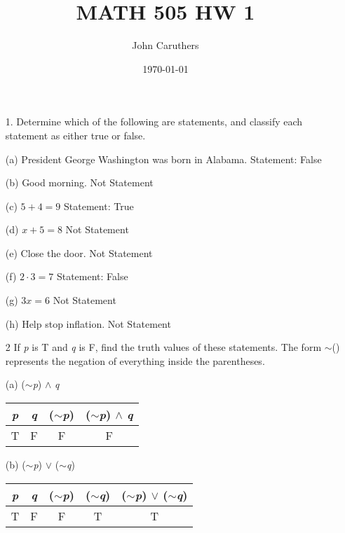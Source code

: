 \documentclass{article}
\title{MATH 505 HW 1}
\author{John Caruthers}
\date\today
\begin{document}
\maketitle

\begin{itemize}
    \item [1.] Determine which of the following are statements, and classify each statement as either true or false.
    
    (a) President George Washington was born in Alabama. {\color{blue} Statement: False}
    
    (b) Good morning. {\color{red} Not Statement}
    
    (c) \(5 + 4 = 9\) {\color{blue} Statement: True}
    
    (d) \(x + 5 = 8\) {\color{red} Not Statement}
    
    (e) Close the door. {\color{red} Not Statement}
    
    (f) \(2 \cdot 3 = 7\) {\color{blue} Statement: False}
    
    (g) \(3x = 6\) {\color{red} Not Statement}
    
    (h) Help stop inflation. {\color{red} Not Statement}
    
    \item[2] If \emph{p} is T and \emph{q} is F, find the truth values of these statements.  The form $\sim$() represents the negation of everything inside the parentheses.
    
    (a) ($\sim$\emph{p}) $\wedge$ \emph{q}
    \begin{center}
        \begin{tabular}{|c|c|c|c|}
             \hline
             \emph{p} & \emph{q} & ($\sim$\emph{p}) & ($\sim$\emph{p}) $\wedge$ \emph{q} \\
             \hline
              T & F & F & F\\
              \hline
        \end{tabular}
    \end{center}
    
    (b) ($\sim$\emph{p}) $\vee$ ($\sim$\emph{q})
    \begin{center}
        \begin{tabular}{|c|c|c|c|c|}
            \hline
            \emph{p} & \emph{q} & ($\sim$\emph{p}) & ($\sim$\emph{q}) &  ($\sim$\emph{p}) $\vee$ ($\sim$\emph{q})\\
            \hline
            T & F & F & T & T\\
            \hline
        \end{tabular}
    \end{center}
    

\end{itemize}
\end{document}
